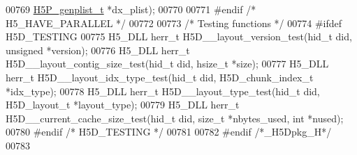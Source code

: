 \begin{DoxyCode}
00769     \hyperlink{struct_h5_p__genplist__t}{H5P\_genplist\_t} *dx\_plist);
00770 
00771 \textcolor{preprocessor}{#endif }\textcolor{comment}{/* H5\_HAVE\_PARALLEL */}\textcolor{preprocessor}{}
00772 
00773 \textcolor{comment}{/* Testing functions */}
00774 \textcolor{preprocessor}{#ifdef H5D\_TESTING}
00775 H5\_DLL herr\_t H5D\_\_layout\_version\_test(hid\_t did, \textcolor{keywordtype}{unsigned} *version);
00776 H5\_DLL herr\_t H5D\_\_layout\_contig\_size\_test(hid\_t did, hsize\_t *size);
00777 H5\_DLL herr\_t H5D\_\_layout\_idx\_type\_test(hid\_t did, H5D\_chunk\_index\_t *idx\_type);
00778 H5\_DLL herr\_t H5D\_\_layout\_type\_test(hid\_t did, H5D\_layout\_t *layout\_type);
00779 H5\_DLL herr\_t H5D\_\_current\_cache\_size\_test(hid\_t did, \textcolor{keywordtype}{size\_t} *nbytes\_used, \textcolor{keywordtype}{int} *nused);
00780 \textcolor{preprocessor}{#endif }\textcolor{comment}{/* H5D\_TESTING */}\textcolor{preprocessor}{}
00781 
00782 \textcolor{preprocessor}{#endif }\textcolor{comment}{/*\_H5Dpkg\_H*/}\textcolor{preprocessor}{}
00783 
\end{DoxyCode}
